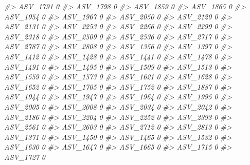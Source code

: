 \documentclass[
]{article}
\newenvironment{Shaded}{\begin{snugshade}}{\end{snugshade}}
\newcommand{\CommentTok}[1]{\textcolor[rgb]{0.56,0.35,0.01}{\textit{#1}}}
\begin{document}
\begin{Shaded}
\begin{Highlighting}[]
\CommentTok{\#\textgreater{} ASV\_1791  0}
\CommentTok{\#\textgreater{} ASV\_1798  0}
\CommentTok{\#\textgreater{} ASV\_1859  0}
\CommentTok{\#\textgreater{} ASV\_1865  0}
\CommentTok{\#\textgreater{} ASV\_1954  0}
\CommentTok{\#\textgreater{} ASV\_1967  0}
\CommentTok{\#\textgreater{} ASV\_2050  0}
\CommentTok{\#\textgreater{} ASV\_2120  0}
\CommentTok{\#\textgreater{} ASV\_2131  0}
\CommentTok{\#\textgreater{} ASV\_2253  0}
\CommentTok{\#\textgreater{} ASV\_2266  0}
\CommentTok{\#\textgreater{} ASV\_2299  0}
\CommentTok{\#\textgreater{} ASV\_2318  0}
\CommentTok{\#\textgreater{} ASV\_2509  0}
\CommentTok{\#\textgreater{} ASV\_2536  0}
\CommentTok{\#\textgreater{} ASV\_2717  0}
\CommentTok{\#\textgreater{} ASV\_2787  0}
\CommentTok{\#\textgreater{} ASV\_2808  0}
\CommentTok{\#\textgreater{} ASV\_1356  0}
\CommentTok{\#\textgreater{} ASV\_1397  0}
\CommentTok{\#\textgreater{} ASV\_1412  0}
\CommentTok{\#\textgreater{} ASV\_1428  0}
\CommentTok{\#\textgreater{} ASV\_1441  0}
\CommentTok{\#\textgreater{} ASV\_1478  0}
\CommentTok{\#\textgreater{} ASV\_1491  0}
\CommentTok{\#\textgreater{} ASV\_1495  0}
\CommentTok{\#\textgreater{} ASV\_1509  0}
\CommentTok{\#\textgreater{} ASV\_1513  0}
\CommentTok{\#\textgreater{} ASV\_1559  0}
\CommentTok{\#\textgreater{} ASV\_1573  0}
\CommentTok{\#\textgreater{} ASV\_1621  0}
\CommentTok{\#\textgreater{} ASV\_1628  0}
\CommentTok{\#\textgreater{} ASV\_1652  0}
\CommentTok{\#\textgreater{} ASV\_1705  0}
\CommentTok{\#\textgreater{} ASV\_1752  0}
\CommentTok{\#\textgreater{} ASV\_1887  0}
\CommentTok{\#\textgreater{} ASV\_1944  0}
\CommentTok{\#\textgreater{} ASV\_1947  0}
\CommentTok{\#\textgreater{} ASV\_1964  0}
\CommentTok{\#\textgreater{} ASV\_1995  0}
\CommentTok{\#\textgreater{} ASV\_2005  0}
\CommentTok{\#\textgreater{} ASV\_2008  0}
\CommentTok{\#\textgreater{} ASV\_2034  0}
\CommentTok{\#\textgreater{} ASV\_2042  0}
\CommentTok{\#\textgreater{} ASV\_2186  0}
\CommentTok{\#\textgreater{} ASV\_2204  0}
\CommentTok{\#\textgreater{} ASV\_2252  0}
\CommentTok{\#\textgreater{} ASV\_2393  0}
\CommentTok{\#\textgreater{} ASV\_2561  0}
\CommentTok{\#\textgreater{} ASV\_2603  0}
\CommentTok{\#\textgreater{} ASV\_2712  0}
\CommentTok{\#\textgreater{} ASV\_2813  0}
\CommentTok{\#\textgreater{} ASV\_1371  0}
\CommentTok{\#\textgreater{} ASV\_1450  0}
\CommentTok{\#\textgreater{} ASV\_1465  0}
\CommentTok{\#\textgreater{} ASV\_1532  0}
\CommentTok{\#\textgreater{} ASV\_1630  0}
\CommentTok{\#\textgreater{} ASV\_1647  0}
\CommentTok{\#\textgreater{} ASV\_1665  0}
\CommentTok{\#\textgreater{} ASV\_1715  0}
\CommentTok{\#\textgreater{} ASV\_1727  0}

\end{Highlighting}
\end{Shaded}
\end{document}
